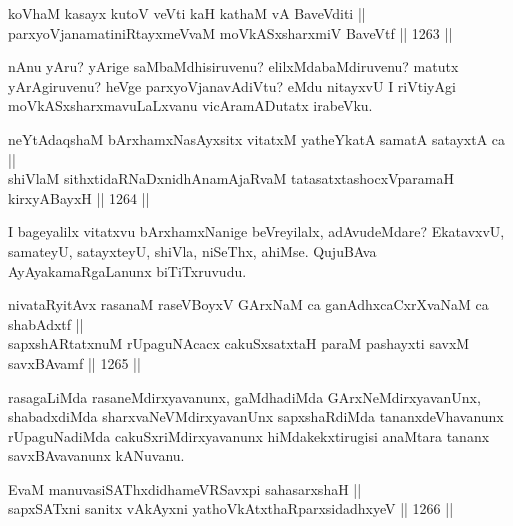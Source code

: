 \begin{shl}
koV\s haM kasayx kutoV veVti kaH kathaM vA BaveVditi ||  \\
parxyoVjanamatiniRtayxmeVvaM moVkASxsharxmiV BaveVtf \hfill || 1263 ||  
\end{shl}

\begin{artha}
nAnu yAru? yArige saMbaMdhisiruvenu? elilxMda\break baMdiruvenu? matutx yArAgiruvenu? heVge parxyoVjanavAdiVtu? eMdu nitayxvU I riVtiyAgi moVkASxsharxmavuLaLxvanu vicAramADutatx irabeVku.
\end{artha}


\begin{shl}
neYtAdaqshaM bArxhamxNasAyxsitx vitatxM yatheYkatA samatA satayxtA ca || \\
shiVlaM sithxtidaRNaDxnidhAnamAjaRvaM tatasatxtashocxVparamaH kirxyABayxH \hfill || 1264 ||  
\end{shl}

\begin{artha}
I bageyalilx vitatxvu bArxhamxNanige beVreyilalx, adAvudeMdare? EkatavxvU, samateyU, satayxteyU, shiVla, niSeThx, ahiMse. QujuBAva AyAyakamaRgaLanunx biTiTxruvudu.
\end{artha}

\begin{shl}
nivataRyitAvx rasanaM raseVBoyxV GArxNaM ca ganAdhxcaCxrXvaNaM ca shabAdxtf || \\
sapxshARtatxnuM rUpaguNAcacx cakuSxsatxtaH paraM pashayxti savxM savxBAvamf \hfill || 1265 ||  
\end{shl}

\begin{artha}
rasagaLiMda rasaneMdirxyavanunx, gaMdhadiMda GArxNeMdirxyavanUnx, shabadxdiMda sharxvaNeVMdirxyavanUnx sapxshaRdiMda tananxdeVhavanunx rUpaguNadiMda cakuSxriMdirxyavanunx hiMdakekxtirugisi anaMtara tananx savxBAvavanunx kANuvanu.
\end{artha}

\begin{shl}
EvaM manuvasiSAThxdidhameVRSavxpi sahasarxshaH || \\
sapxSATxni sanitx vAkAyxni yathoVkAtxthaRparxsidadhxyeV \hfill || 1266 || 
\end{shl}

